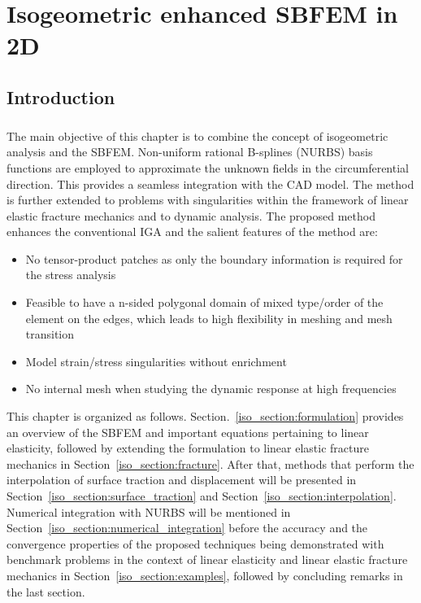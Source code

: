\chapter{Isogeometric enhanced SBFEM in 2D}
\label{Iso_sec:main}
\section{Introduction}
\paragraph{}
The main objective of this chapter is to combine the concept of isogeometric analysis and the SBFEM.
Non-uniform rational B-splines (NURBS) basis functions are employed to approximate the unknown fields in the circumferential direction.
This provides a seamless integration with the CAD model.
The method is further extended to problems with singularities within the framework of linear elastic fracture mechanics and to dynamic analysis.
The proposed method enhances the conventional IGA and the salient features of the method are:
    \begin{itemize}
        \item No tensor-product patches as only the boundary information is required for the stress analysis
        \item Feasible to have a n-sided polygonal domain of mixed type/order of the element on the edges, 
                which leads to high flexibility in meshing and mesh transition
        \item Model strain/stress singularities without enrichment
        \item No internal mesh when studying the dynamic response at high frequencies
    \end{itemize}


This chapter is organized as follows.
Section.~\ref{iso_section:formulation} provides an overview of the SBFEM and important equations pertaining to linear elasticity,
followed by extending the formulation to linear elastic fracture mechanics in Section~\ref{iso_section:fracture}.
After that, methods that perform the interpolation of surface traction and displacement will be presented in Section~\ref{iso_section:surface_traction} and Section~\ref{iso_section:interpolation}.
Numerical integration with NURBS will be mentioned in Section~\ref{iso_section:numerical_integration} before the accuracy and the convergence properties of the proposed techniques being demonstrated with benchmark problems in the context of linear elasticity and linear elastic fracture mechanics in Section~\ref{iso_section:examples}, followed by concluding remarks in the last section.
\pagebreak




  
